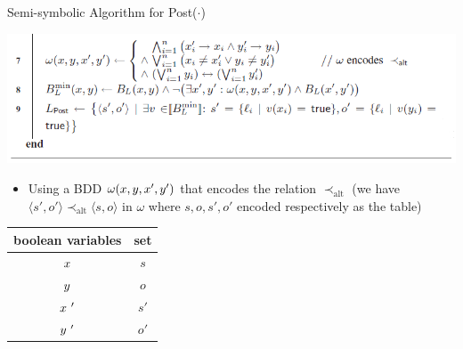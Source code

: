 \documentclass[12pt]{beamer}
\begin{document}
\begin{frame}{Semi-symbolic Algorithm for Post($\cdot$)}
	\label{Algorithm1_part2}
	\begin{center}
		\includegraphics[scale=0.5]{Algorithm1_part2}
	\end{center}
	\begin{minipage}{.5\textwidth}
		\begin{itemize}
			\item Using a BDD $\omega (\mathnormal{x}, \mathnormal{y}, \mathnormal{x}', \mathnormal{y}')$ that encodes the relation $\prec_{\text{alt}}$ (we have $\langle s', o' \rangle \prec_{\text{alt}} \langle s, o \rangle$ in $\omega$ where $s, o, s', o'$ encoded respectively as the table) 
		\end{itemize}
	\end{minipage}%
	\begin{minipage}{.5\textwidth}
		\small
		\centering
		\begin{tabular}{ ||c|c|| } 
			\hline
			boolean variables & set \\
			\hline \hline
			$\mathnormal{x}$ & $s$ \\
			\hline 
			$\mathnormal{y}$ & $o$ \\
			\hline
			$\mathnormal{x}~'$ & $s'$ \\
			\hline
			$\mathnormal{y}~'$ & $o'$ \\ 
			\hline
		\end{tabular}
	\end{minipage}
\end{frame}
\end{document}
